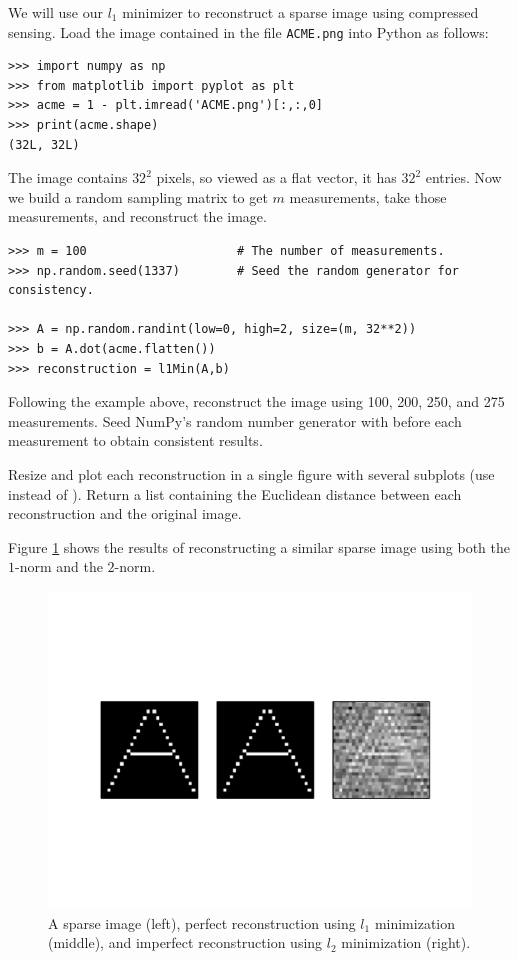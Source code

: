 We will use our $l_1$ minimizer to reconstruct a sparse image using compressed sensing.
Load the image contained in the file \texttt{ACME.png} into Python as follows:
\begin{lstlisting}
>>> import numpy as np
>>> from matplotlib import pyplot as plt
>>> acme = 1 - plt.imread('ACME.png')[:,:,0]
>>> print(acme.shape)
(32L, 32L)
\end{lstlisting}
The image contains $32^2$ pixels, so viewed as a flat vector, it has $32^2$ entries.
Now we build a random sampling matrix to get $m$ measurements, take those measurements, and reconstruct the image.
\begin{lstlisting}
>>> m = 100                     # The number of measurements.
>>> np.random.seed(1337)        # Seed the random generator for consistency.

>>> A = np.random.randint(low=0, high=2, size=(m, 32**2))
>>> b = A.dot(acme.flatten())
>>> reconstruction = l1Min(A,b)
\end{lstlisting}

\begin{problem}
Following the example above, reconstruct the image using 100, 200, 250, and 275 measurements.
Seed NumPy's random number generator with  before each measurement to obtain consistent results.

Resize and plot each reconstruction in a single figure with several subplots (use  instead of ).
Return a list containing the Euclidean distance between each reconstruction and the original image.
\end{problem}

Figure \ref{fig:reconstruct} shows the results of reconstructing a similar sparse image using both the $1$-norm and 
the $2$-norm.

\begin{figure}
\centering
\includegraphics[width=\textwidth]{reconstruct.pdf}
\caption{A sparse image (left), perfect reconstruction using $l_1$ minimization (middle),  and
imperfect reconstruction using $l_2$ minimization (right).}
\label{fig:reconstruct}
\end{figure}
